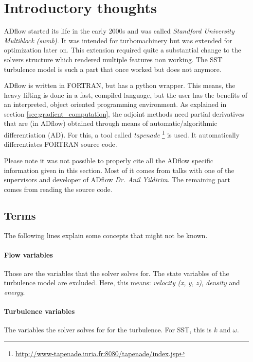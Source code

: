 \section{Introductory thoughts}
ADflow started its life in the early 2000s and was called \textit{Standford
University Multiblock (sumb)}. It was intended for turbomachinery but was
extended for optimization later on. This extension required quite a
substantial change to the solvers structure which rendered multiple features
non working. The SST turbulence model is such a part that once worked but does
not anymore.

ADflow is written in FORTRAN, but has a python wrapper. This means, the heavy
lifting is done in a fast, compiled language, but the user has the benefits of
an interpreted, object oriented programming environment. As explained in
section \ref{sec:gradient_computation}, the adjoint methods need partial
derivatives that are (in ADflow) obtained through means of
automatic/algorithmic differentiation (AD). For this, a tool called
\textit{tapenade}
\footnote{\url{http://www-tapenade.inria.fr:8080/tapenade/index.jsp}} is used.
It automatically differentiates FORTRAN source code.

Please note it was not possible to properly cite all the ADflow specific
information given in this section. Most of it comes from talks with one of the
supervisors and developer of ADflow \textit{Dr. Anil Yildirim}. The remaining
part comes from reading the source code.




\subsection{Terms}
The following lines explain some concepts that might not be known.

\paragraph{Flow variables} Those are the variables that the solver solves for.
The state variables of the turbulence model are excluded. Here, this means:
\textit{velocity (x, y, z)}, \textit{density} and \textit{energy}.

\paragraph{Turbulence variables} The variables the solver solves for for the
turbulence. For SST, this is $k$ and $\omega$.

